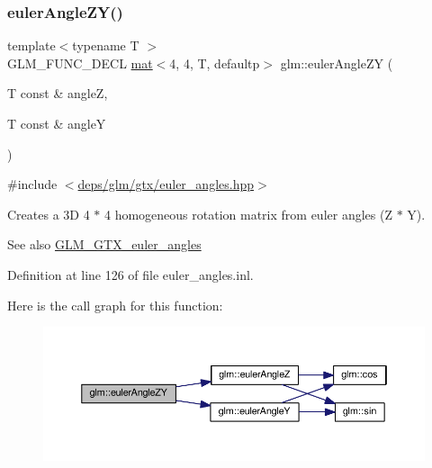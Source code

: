 \subsubsection{\texorpdfstring{euler\+Angle\+Z\+Y()}{eulerAngleZY()}}
{\footnotesize\ttfamily template$<$typename T $>$ \\
G\+L\+M\+\_\+\+F\+U\+N\+C\+\_\+\+D\+E\+CL \hyperlink{structglm_1_1mat}{mat}$<$4, 4, T, defaultp$>$ glm\+::euler\+Angle\+ZY (\begin{DoxyParamCaption}\item[{T const \&}]{angleZ,  }\item[{T const \&}]{angleY }\end{DoxyParamCaption})}



{\ttfamily \#include $<$\hyperlink{euler__angles_8hpp}{deps/glm/gtx/euler\+\_\+angles.\+hpp}$>$}

Creates a 3D 4 $\ast$ 4 homogeneous rotation matrix from euler angles (Z $\ast$ Y). \begin{DoxySeeAlso}{See also}
\hyperlink{group__gtx__euler__angles}{G\+L\+M\+\_\+\+G\+T\+X\+\_\+euler\+\_\+angles} 
\end{DoxySeeAlso}


Definition at line 126 of file euler\+\_\+angles.\+inl.

Here is the call graph for this function\+:
\nopagebreak
\begin{figure}[H]
\begin{center}
\leavevmode
\includegraphics[width=350pt]{d2/d7e/group__gtx__euler__angles_ga400b2bd5984999efab663f3a68e1d020_cgraph}
\end{center}
\end{figure}
\mbox{\label{group__gtx__euler__angles_gacea701562f778c1da4d3a0a1cf091000}} 
